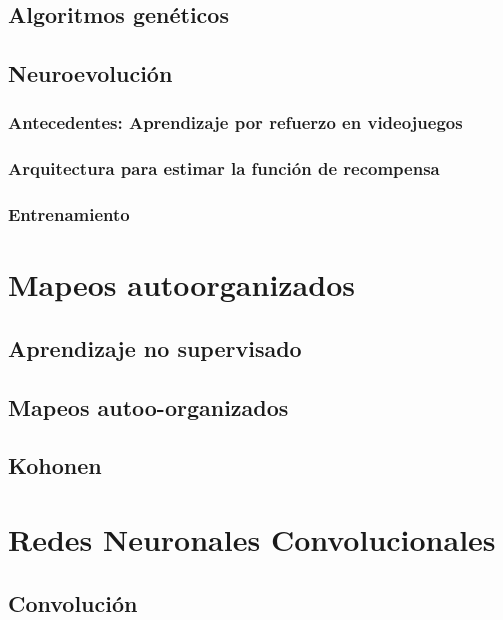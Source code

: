 \documentclass[12pt,openany]{book}
\begin{document}
\section{Algoritmos genéticos}
\section{Neuroevolución}
\subsection{Antecedentes: Aprendizaje por refuerzo en videojuegos}
\subsection{Arquitectura para estimar la función de recompensa}
\subsection{Entrenamiento}

\chapter{Mapeos autoorganizados}
\section{Aprendizaje no supervisado}
\section{Mapeos autoo-organizados}
\section{Kohonen}

\chapter{Redes Neuronales Convolucionales}
\section{Convolución}
\end{document}
